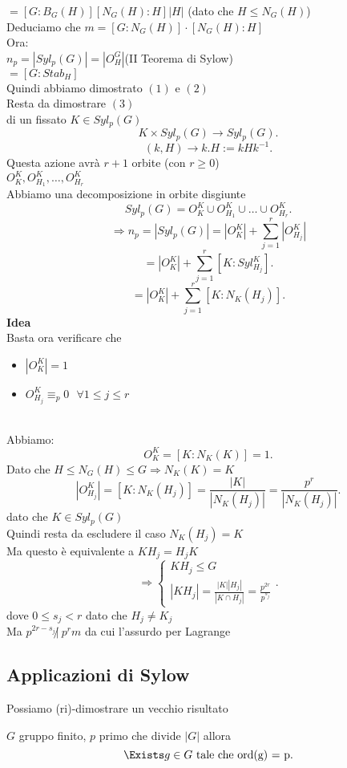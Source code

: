 \documentclass[12px]{article}
\begin{document}
{\begin{dimo}
\begin{dimo}
		 $=[G:B_G(H)][N_G(H):H]|H|$\hfill
		 (dato che $H\leq N_G(H)$) \\
		 Deduciamo che $m = [G:N_G(H)]\cdot[N_G(H):H]$\\
		 Ora:\\
	 $n_p = |Syl_p(G)| = |O_H^G|$\hfill (II Teorema di Sylow)\\
	 $ = [G:Stab_H]$\\
	 Quindi abbiamo dimostrato $(1)$ e $(2)$\\
	 Resta da dimostrare $(3)$\\
	 di un fissato  $K\in Syl_p(G)$\\
	 \[
		 K\times Syl_p(G) \rightarrow Syl_p (G)
	 .\] 
	 \[
		 (k,H) \rightarrow k.H := kHk^{-1}
	 .\] 
	 Questa azione avrà $r + 1$ orbite (con $r \geq 0$)\\
	 $O_K^K, O_{H_1}^K,\ldots,O_{H_r}^K$\\
	 Abbiamo una decomposizione in orbite disgiunte
	 \[
		 Syl_p(G) = O_K^K\cup O_{H_1}^K\cup\ldots\cup O_{H_r}^K
	 .\] 
	 \[ \Rightarrow n_p = |Syl_p (G)| = |O_K^K| + \sum^r_{j=1}|O_{H_j}^K|\]
	 \[
		 =|O_K^K| + \sum^r_{j=1}[K:Syl_{H_j}^K]
	 .\] 
	 \[
		 = |O_K^K| + \sum^r_{j=1}[K:N_K(H_j)]
	 .\]
	 \textbf{Idea}\\
	 Basta ora verificare che
	 \begin{itemize}
		 \item $|O_K^K| = 1$
		 \item  $O_{H_j}^K\equiv_p 0 \ \ \ \forall 1\leq j\leq r$
	 \end{itemize}\\
	 Abbiamo:\\
	  \[
		  O_K^K = [K:N_K(K)] = 1
	 .\] 
	 Dato che $H\leq N_G(H)\leq G \Rightarrow N_K(K) = K$ 
	 \[
		 |O_{H_j}^K| = [K:N_K(H_j)] = \frac {|K|}{|N_K(H_{j})|} = \frac {p^r}{|N_K(H_j)|}
	 .\] 
	 dato che $K \in Syl_p(G)$\\
	 Quindi resta da escludere il caso  $N_K(H_j) = K$\\
	 Ma questo è equivalente a  $KH_j = H_j K$ 
	 \[
	 \Rightarrow \begin{cases}
	 	KH_j\leq G\\
		|KH_j| = \frac { |K||H_j|}{|K\cap H_j|} = \frac{p^{2r}}{p^{s_j}}
	 \end{cases}
	 .\] 
	 dove $0\leq s_j < r$ dato che  $H_j\neq K_j$\\
	 Ma  $p^{2r-s_j}\not | \ p^rm$ da cui l'assurdo per Lagrange
	\end{dimo}
	\subsection{Applicazioni di Sylow}
	Possiamo (ri)-dimostrare un vecchio risultato
	\begin{teo}[Cauchy]
		$G$ gruppo finito, $p$ primo che divide $|G|$ allora\\
		 \[
			 \Exists g\in G\text{ tale che } $ord(g) = p$
		.\] 
		

\end{teo}
\end{dimo}}
\end{document}
